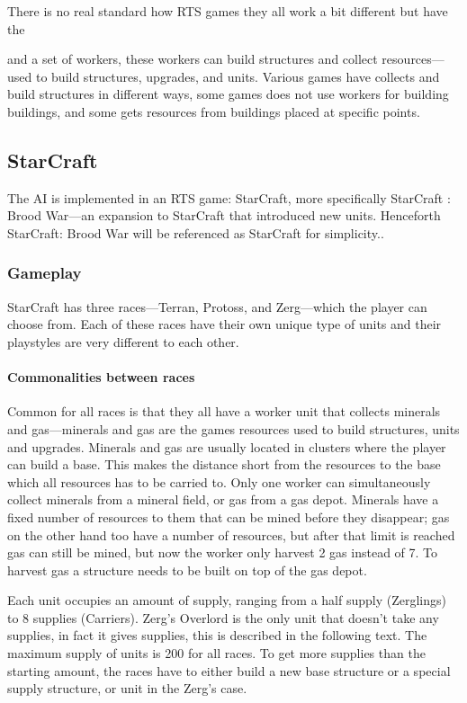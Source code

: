 There is no real standard how RTS games they all work a bit different but have the

and a set of workers, these workers can build structures and collect resources—used to build structures, upgrades, and units. Various games have collects and build structures in different ways, some games does not use workers for building buildings, and some gets resources from buildings placed at specific points.


\subsection{StarCraft}
The AI is implemented in an RTS game: StarCraft, more specifically StarCraft : Brood War—an expansion to StarCraft that introduced new units. Henceforth StarCraft: Brood War will be referenced as StarCraft for simplicity..


\subsubsection{Gameplay}
StarCraft has three races—Terran, Protoss, and Zerg—which the player can choose from. Each of these races have their own unique type of units and their playstyles are very different to each other.

\paragraph{Commonalities between races}
Common for all races is that they all have a worker unit that collects minerals and gas—minerals and gas are the games resources used to build structures, units and upgrades. Minerals and gas are usually located in clusters where the player can build a base. This makes the distance short from the resources to the base which all resources has to be carried to. Only one worker can simultaneously collect minerals from a mineral field, or gas from a gas depot. Minerals have a fixed number of resources to them that can be mined before they disappear; gas on the other hand too have a number of resources, but after that limit is reached gas can still be mined, but now the worker only harvest 2 gas instead of 7. To harvest gas a structure needs to be built on top of the gas depot.

Each unit occupies an amount of supply, ranging from a half supply (Zerglings) to 8 supplies (Carriers). Zerg's Overlord is the only unit that doesn't take any supplies, in fact it gives supplies, this is described in the following text. The maximum supply of units is 200 for all races. To get more supplies than the starting amount, the races have to either build a new base structure or a special supply structure, or unit in the Zerg's case.

